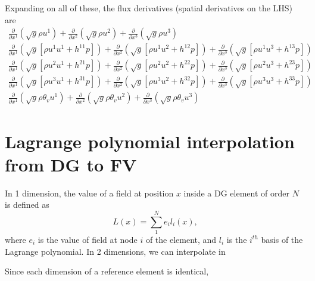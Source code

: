 \documentclass{article}
\begin{document}
Expanding on all of these, the flux derivatives (spatial derivatives on the LHS) are
\begin{align}
        \frac{\partial}{\partial x^1}\left( \sqrt{g}\rho u^1 \right)
      + \frac{\partial}{\partial x^2}\left( \sqrt{g}\rho u^2 \right)
      + \frac{\partial}{\partial x^3}\left( \sqrt{g}\rho u^3 \right) \\
        \frac{\partial}{\partial x^1}\left( \sqrt{g}\left[\rho u^1u^1+h^{11}p\right]\right)
      + \frac{\partial}{\partial x^2}\left( \sqrt{g}\left[\rho u^1u^2+h^{12}p\right]\right)
      + \frac{\partial}{\partial x^3}\left( \sqrt{g}\left[\rho u^1u^3+h^{13}p\right]\right) \\
        \frac{\partial}{\partial x^1}\left( \sqrt{g}\left[\rho u^2u^1+h^{21}p\right]\right)
      + \frac{\partial}{\partial x^2}\left( \sqrt{g}\left[\rho u^2u^2+h^{22}p\right]\right)
      + \frac{\partial}{\partial x^3}\left( \sqrt{g}\left[\rho u^2u^3+h^{23}p\right]\right) \\
        \frac{\partial}{\partial x^1}\left( \sqrt{g}\left[\rho u^3u^1+h^{31}p\right]\right)
      + \frac{\partial}{\partial x^2}\left( \sqrt{g}\left[\rho u^3u^2+h^{32}p\right]\right)
      + \frac{\partial}{\partial x^3}\left( \sqrt{g}\left[\rho u^3u^3+h^{33}p\right]\right) \\
        \frac{\partial}{\partial x^1}\left( \sqrt{g}\rho\theta_v u^1 \right)
      + \frac{\partial}{\partial x^2}\left( \sqrt{g}\rho\theta_v u^2 \right)
      + \frac{\partial}{\partial x^3}\left( \sqrt{g}\rho\theta_v u^3 \right)
\end{align}

\section{Lagrange polynomial interpolation from DG to FV}

In 1 dimension, the value of a field at position $x$ inside a DG element of order $N$
is defined as
\begin{equation}
    L(x) = \sum_1^N e_i l_i(x)
    \text{,}
\end{equation}
where $e_i$ is the value of field at node $i$ of the element, and $l_i$ is the $i^{th}$ basis of
the Lagrange polynomial.
In 2 dimensions, we can interpolate in 

Since each dimension of a reference element is identical, 

\glsaddallunused
\printglossaries
\end{document}
